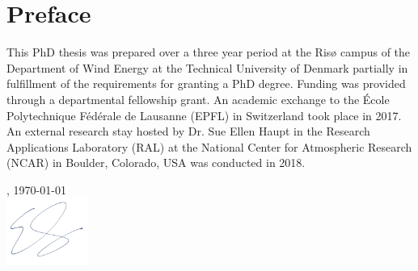 \chapter{Preface}
\label{sec:preface}


This PhD thesis was prepared over a three year period at the Ris{\o} campus of the Department of Wind Energy at the Technical University of Denmark partially in fulfillment of the requirements for granting a PhD degree. Funding was provided through a departmental fellowship grant. An academic exchange to the {\'E}cole Polytechnique F{\'e}d{\'e}rale de Lausanne (EPFL) in Switzerland took place in 2017. An external research stay hosted by Dr. Sue Ellen Haupt in the Research Applications Laboratory (RAL) at the National Center for Atmospheric Research (NCAR) in Boulder, Colorado, USA was conducted in 2018.

\vfill

{
\flushright
    \thesislocation{}, \today\\[1cm]
    \hspace{3cm}\includegraphics[width=0.2\textwidth]{graphics/signature.png}\\[1cm]
\begin{flushright}
    \thesisauthor{}
\end{flushright}
}
